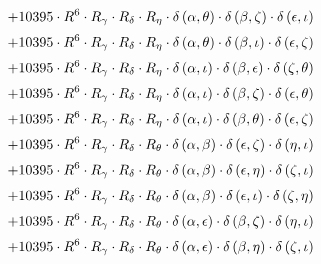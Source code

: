 \begin{subequations}
\begin{gather}
 \\[0.2em] \notag 		 + 10395 \cdot R^{6} \cdot R_{\gamma{}} \cdot R_{\delta{}} \cdot R_{\eta{}} \cdot \delta{}\left(\alpha{}, \theta{}\right) \cdot \delta{}\left(\beta{}, \zeta{}\right) \cdot \delta{}\left(\epsilon{}, \iota{}\right) 
 \\[0.2em] \notag 		 + 10395 \cdot R^{6} \cdot R_{\gamma{}} \cdot R_{\delta{}} \cdot R_{\eta{}} \cdot \delta{}\left(\alpha{}, \theta{}\right) \cdot \delta{}\left(\beta{}, \iota{}\right) \cdot \delta{}\left(\epsilon{}, \zeta{}\right) 
 \\[0.2em] \notag 		 + 10395 \cdot R^{6} \cdot R_{\gamma{}} \cdot R_{\delta{}} \cdot R_{\eta{}} \cdot \delta{}\left(\alpha{}, \iota{}\right) \cdot \delta{}\left(\beta{}, \epsilon{}\right) \cdot \delta{}\left(\zeta{}, \theta{}\right) 
 \\[0.2em] \notag 		 + 10395 \cdot R^{6} \cdot R_{\gamma{}} \cdot R_{\delta{}} \cdot R_{\eta{}} \cdot \delta{}\left(\alpha{}, \iota{}\right) \cdot \delta{}\left(\beta{}, \zeta{}\right) \cdot \delta{}\left(\epsilon{}, \theta{}\right) 
 \\[0.2em] \notag 		 + 10395 \cdot R^{6} \cdot R_{\gamma{}} \cdot R_{\delta{}} \cdot R_{\eta{}} \cdot \delta{}\left(\alpha{}, \iota{}\right) \cdot \delta{}\left(\beta{}, \theta{}\right) \cdot \delta{}\left(\epsilon{}, \zeta{}\right) 
 \\[0.2em] \notag 		 + 10395 \cdot R^{6} \cdot R_{\gamma{}} \cdot R_{\delta{}} \cdot R_{\theta{}} \cdot \delta{}\left(\alpha{}, \beta{}\right) \cdot \delta{}\left(\epsilon{}, \zeta{}\right) \cdot \delta{}\left(\eta{}, \iota{}\right) 
 \\[0.2em] \notag 		 + 10395 \cdot R^{6} \cdot R_{\gamma{}} \cdot R_{\delta{}} \cdot R_{\theta{}} \cdot \delta{}\left(\alpha{}, \beta{}\right) \cdot \delta{}\left(\epsilon{}, \eta{}\right) \cdot \delta{}\left(\zeta{}, \iota{}\right) 
 \\[0.2em] \notag 		 + 10395 \cdot R^{6} \cdot R_{\gamma{}} \cdot R_{\delta{}} \cdot R_{\theta{}} \cdot \delta{}\left(\alpha{}, \beta{}\right) \cdot \delta{}\left(\epsilon{}, \iota{}\right) \cdot \delta{}\left(\zeta{}, \eta{}\right) 
 \\[0.2em] \notag 		 + 10395 \cdot R^{6} \cdot R_{\gamma{}} \cdot R_{\delta{}} \cdot R_{\theta{}} \cdot \delta{}\left(\alpha{}, \epsilon{}\right) \cdot \delta{}\left(\beta{}, \zeta{}\right) \cdot \delta{}\left(\eta{}, \iota{}\right) 
 \\[0.2em] \notag 		 + 10395 \cdot R^{6} \cdot R_{\gamma{}} \cdot R_{\delta{}} \cdot R_{\theta{}} \cdot \delta{}\left(\alpha{}, \epsilon{}\right) \cdot \delta{}\left(\beta{}, \eta{}\right) \cdot \delta{}\left(\zeta{}, \iota{}\right) 

\end{gather}
\end{subequations}
